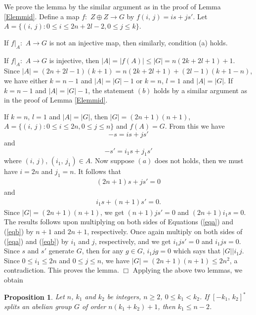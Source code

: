 \documentclass[12pt]{article}
\newtheorem{open problem}{Open problem}[section]
\newtheorem{prop}{Proposition}[section]
\newenvironment{proof}{\trivlist
      \item[\hskip\labelsep
      {\itshape Proof.}]\normalfont}
      {\hspace*{\fill}$\Box$\endtrivlist}
\begin{document}
\begin{proof} We prove the lemma by the similar argument as in the proof of Lemma \ref{Elemmid}.
Define a map $f:$ $Z\oplus Z\rightarrow G$ by $f(i, \,j)=is+js'$.
Let $A=\{(i, \,j):0\leq i\leq 2n+2l-2,0\leq j\leq k\}$.

If $f|_A:$ $A\rightarrow G$ is not an injective map, then similarly, condition (a) holds.

If $f|_A:$ $A\rightarrow G$ is injective, then $|A|=|f(A)|\leq |G|=n(2k+2l+1)+1$.
Since $|A|=(2n+2l-1)(k+1)=n(2k+2l+1)+(2l-1)(k+1-n)$,
we have either $k=n-1$ and $|A|=|G|-1$ or $k=n$, $l=1$ and $|A|=|G|$.
If $k=n-1$ and $|A|=|G|-1$,
the statement $(b)$ holds by a similar argument as in the proof of Lemma \ref{Elemmid}.

If $k=n$, $l=1$ and $|A|=|G|$,
then $|G|=(2n+1)(n+1)$, $A=\{(i, \,j):0\leq i\leq 2n,0\leq j\leq n\}$ and $f(A)=G$.
From this we have
$$-s=is+js'$$ and $$-s'=i_1s+j_1s'$$
where $(i, \,j)$, $(i_1, \,j_1)\in A$.
Now suppose  $(a)$ does not holds, then we must have $i=2n$ and $j_1=n$.
It follows that
\begin{gather}
(2n+1)s+js'=0  \label{eqa}
\end{gather}
and
\begin{gather}
i_1s+(n+1)s'=0.  \label{eqb}
\end{gather}
Since $|G|=(2n+1)(n+1)$,
we get $(n+1)js'=0$ and $(2n+1)i_1s=0$.
The results follows upon multiplying on both sides of Equations (\ref{eqa}) and (\ref{eqb}) by $n+1$ and $2n+1$, respectively.
Once again multiply on both sides of (\ref{eqa}) and (\ref{eqb}) by $i_1$ and $j$, respectively,
and we get $i_1js'=0$ and $i_1js=0$.
Since $s$ and $s'$ generate $G$, then for any $g\in G$, $i_1jg=0$
which says that $|G||i_1j$.
Since $0\leq i_1\leq 2n$ and $0\leq j\leq n$, we have $|G|=(2n+1)(n+1)\leq 2n^2$,
a contradiction. This proves the lemma.
\end{proof}
Applying the above two lemmas, we obtain
\begin{prop} \label{EOthm}
Let $n$, $k_1$ and $k_2$ be integers, $n\geq 2$, $0\leq k_1< k_2$.
If $[-k_1, \,k_2]^*$ splits an abelian group $G$ of order $n(k_1+k_2)+1$,
then $k_1\leq n-2$.
\end{prop}
\end{document}
